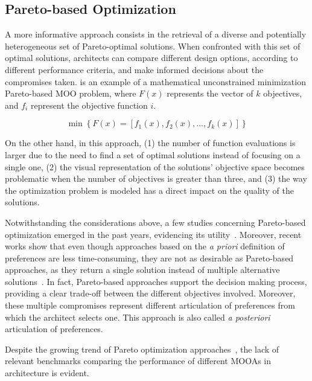 \subsection{Pareto-based Optimization}

A more informative approach consists in the retrieval of a diverse and potentially heterogeneous set of Pareto-optimal solutions. When confronted with this set of optimal solutions, architects can compare different design options, according to different performance criteria, and make informed decisions about the compromises taken.  is an example of a mathematical unconstrained minimization Pareto-based \ac{MOO} problem, where $F(x)$ represents the vector of $k$ objectives, and $f_i$ represent the objective function $i$.
		
\begin{equation} \label{eq:pareto-based}
   	\min \left\lbrace F(x) = \left[f_1(x), f_2(x), ..., f_k(x)\right] \right\rbrace
\end{equation}
    
On the other hand, in this approach, (1) the number of function evaluations is larger due to the need to find a set of optimal solutions instead of focusing on a single one, (2) the visual representation of the solutions’ objective space becomes problematic when the number of objectives is greater than three, and (3) the way the optimization problem is modeled has a direct impact on the quality of the solutions.

Notwithstanding the considerations above, a few studies concerning Pareto-based optimization emerged in the past years, evidencing its utility~\cite{Evins2013,Hamdy2016}. Moreover, recent works show that even though
approaches based on the \textit{a priori} definition of preferences are less time-consuming, they are not as desirable as Pareto-based approaches, as they return a single solution instead of multiple alternative solutions~\cite{Attia2013,Hamdy2016,Cichocka2017SURVEY}. In fact, Pareto-based approaches support the decision making process, providing a clear trade-off between the different objectives involved. Moreover, these multiple compromises represent different articulation of preferences from which the architect selects one. This approach is also called \textit{a posteriori} articulation of preferences.

Despite the growing trend of Pareto optimization approaches~\cite{Evins2013, Hamdy2016}, the lack of relevant benchmarks comparing the performance of different \acp{MOOA} in architecture is evident. 

